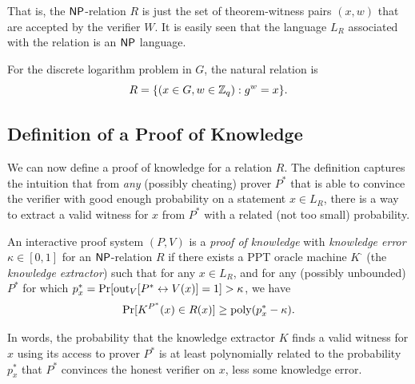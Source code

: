 \documentclass[11pt]{article}
\begin{document}
That is, the $\mathsf{NP}$-relation $R$ is just the set of theorem-witness
pairs $(x,w)$ that are accepted by the verifier $W$.  It is easily
seen that the language $L_{R}$ associated with the relation is an
$\mathsf{NP}$ language.

\begin{example}
  \label{ex:dlog-relation}
  For the discrete logarithm problem in $G$, the natural relation
  is \[ R = \{(x \in G, w \in \mathbb{Z}_q) : g^{w} = x\}. \]
\end{example}

\subsection{Definition of a Proof of Knowledge}
\label{sec:defin-proof-knowl}

We can now define a proof of knowledge for a relation $R$.  The
definition captures the intuition that from \emph{any} (possibly
cheating) prover $P^{*}$ that is able to convince the verifier with
good enough probability on a statement $x \in L_{R}$, there is a way
to extract a valid witness for $x$ from $P^{*}$ with a related (not
too small) probability.

\begin{definition}
  \label{def:pok}
  An interactive proof system $(P,V)$ is a \emph{proof of knowledge}
  with \emph{knowledge error} $\kappa \in [0,1]$ for an $\mathsf{NP}$-relation
  $R$ if there exists a PPT oracle machine $K^{\cdot}$ (the
  \emph{knowledge extractor}) such that for any $x \in L_{R}$, and for
  any (possibly unbounded) $P^{*}$ for which $p^{*}_{x} =
  \Pr[\text{out}_{V}[P^{*} \leftrightarrow V(x)] = 1] > \kappa$, we have \[
  \Pr[K^{P^{*}}(x) \in R(x)] \geq \operatorname{poly}(p^{*}_{x} - \kappa). \]
\end{definition}

In words, the probability that the knowledge extractor $K$ finds a
valid witness for $x$ using its access to prover $P^{*}$ is at least
polynomially related to the probability $p^{*}_{x}$ that $P^{*}$
convinces the honest verifier on $x$, less some knowledge error.
\end{document}

